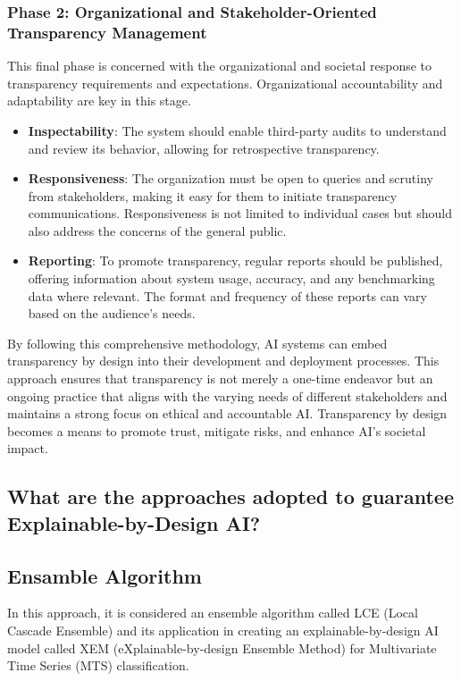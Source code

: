 \documentclass{article}
\begin{document}
\subsubsection{Phase 2: Organizational and Stakeholder-Oriented Transparency Management}

This final phase is concerned with the organizational and societal response to transparency requirements and expectations. Organizational accountability and adaptability are key in this stage.

\begin{itemize}
    \item \textbf{Inspectability}: The system should enable third-party audits to understand and review its behavior, allowing for retrospective transparency.
    
    \item \textbf{Responsiveness}: The organization must be open to queries and scrutiny from stakeholders, making it easy for them to initiate transparency communications. Responsiveness is not limited to individual cases but should also address the concerns of the general public.
    
    \item \textbf{Reporting}: To promote transparency, regular reports should be published, offering information about system usage, accuracy, and any benchmarking data where relevant. The format and frequency of these reports can vary based on the audience's needs.
\end{itemize}

By following this comprehensive methodology, AI systems can embed transparency by design into their development and deployment processes. This approach ensures that transparency is not merely a one-time endeavor but an ongoing practice that aligns with the varying needs of different stakeholders and maintains a strong focus on ethical and accountable AI. Transparency by design becomes a means to promote trust, mitigate risks, and enhance AI's societal impact.

\newpage
\subsection{What are the approaches adopted to guarantee Explainable-by-Design AI?}
\subsection{Ensamble Algorithm} \cite{DBLP:journals/corr/abs-2005-03645}
In this approach, it is considered an ensemble algorithm called LCE (Local Cascade Ensemble) and its application in creating an explainable-by-design AI model called XEM (eXplainable-by-design Ensemble Method) for Multivariate Time Series (MTS) classification.
\end{document}
